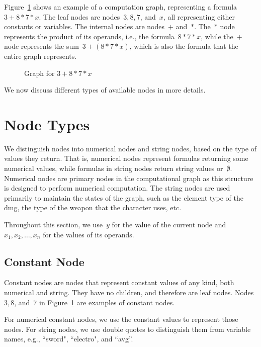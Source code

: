 \documentclass{article}
\begin{document}
Figure~\ref{fig:design:graph-example} shows an example of a computation graph, representing a formula~$3 + 8 * 7 * x$.
The leaf nodes are nodes~$3, 8, 7$, and~$x$, all representing either constants or variables.
The internal nodes are nodes~$+$ and~$*$.
The~$*$ node represents the product of its operands, i.e., the formula~$8 * 7 * x$, while the~$+$ node represents the sum~$3 + (8 * 7 * x)$, which is also the formula that the entire graph represents.
%
\begin{figure}
  \centering
  \caption{Graph for $3 + 8 * 7 * x$}
  \label{fig:design:graph-example}
\end{figure}

We now discuss different types of available nodes in more details.

\section{Node Types}

We distinguish nodes into numerical nodes and string nodes, based on the type of values they return.
That is, numerical nodes represent formulas returning some numerical values, while formulas in string nodes return string values or~$\emptyset$.
Numerical nodes are primary nodes in the computational graph as this structure is designed to perform numerical computation.
The string nodes are used primarily to maintain the states of the graph, such as the element type of the dmg, the type of the weapon that the character uses, etc.

Throughout this section, we use~$y$ for the value of the current node and~$x_1, x_2, \dots, x_n$ for the values of its operands.

\subsection{Constant Node}

Constant nodes are nodes that represent constant values of any kind, both numerical and string.
They have no children, and therefore are leaf nodes.
Nodes~$3, 8$, and~$7$ in Figure~\ref{fig:design:graph-example} are examples of constant nodes.

For numerical constant nodes, we use the constant values to represent those nodes.
For string nodes, we use double quotes to distinguish them from variable names, e.g., ``sword", ``electro", and ``avg''.
\end{document}

